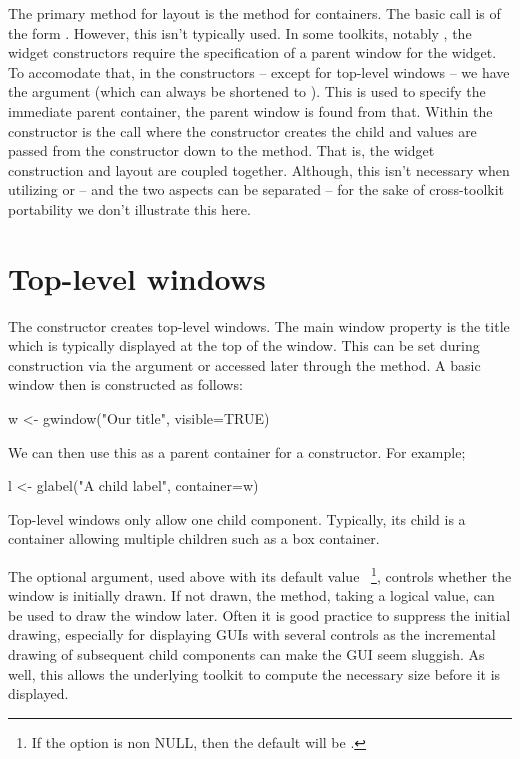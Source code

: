 The primary method for layout is the  method for
containers. The basic call is of the form . However, this isn't typically used. In some
toolkits, notably , the widget constructors require the
specification of a parent window for the widget. To accomodate that,
in the  constructors -- except for top-level windows --
we have the argument  (which can always be shortened
to ). This is used to specify the
immediate parent container, the parent window is found from
that. Within the constructor is the call  where the constructor creates the child and 
values are passed from the constructor down to the 
method. That is, the widget construction and layout are coupled
together. Although, this isn't necessary when utilizing  or
 -- and the two aspects can be separated -- for the sake
of cross-toolkit portability we don't illustrate this here.




\section{Top-level windows}
\label{sec:gWidgets-top-level-windows}

The  constructor creates top-level windows. The
main window property is the title which is typically displayed at the
top of the window. This can be set during construction via the
 argument or accessed later through the
 method. A basic window then is constructed as follows:

\begin{Schunk}
\begin{Sinput}
 w <- gwindow("Our title", visible=TRUE)
\end{Sinput}
\end{Schunk}
%

We can then use this as a parent container for a constructor. For example;
\begin{Schunk}
\begin{Sinput}
 l <- glabel("A child label", container=w)
\end{Sinput}
\end{Schunk}
Top-level windows only allow one child component. Typically, its child
is a container allowing multiple children such as a box container.


The optional  argument, used above with its
default value ~\footnote{If the option
 is non NULL, then the
default will be .}, controls whether the
window is initially drawn. If not drawn, the
 method, taking a logical value, can
be used to draw the window later.  Often it is good practice to suppress
the initial drawing, especially for displaying GUIs with several
controls as the incremental drawing of subsequent child components can
make the GUI seem sluggish. As well, this allows the underlying
toolkit to compute the necessary size before it is displayed.


